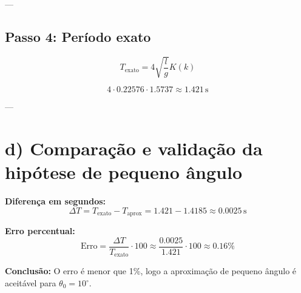 \documentclass[12pt]{article}
\begin{document}
---

\subsection*{Passo 4: Período exato}

\[
T_\text{exato} = 4 \sqrt{\frac{l}{g}} K(k)
\]

\[
4 \cdot 0.22576 \cdot 1.5737 \approx 1.421\,\text{s}
\]

---

\section*{d) Comparação e validação da hipótese de pequeno ângulo}

\textbf{Diferença em segundos:}
\[
\Delta T = T_\text{exato} - T_\text{aprox} = 1.421 - 1.4185 \approx 0.0025\,\text{s}
\]

\textbf{Erro percentual:}
\[
\text{Erro} = \frac{\Delta T}{T_\text{exato}} \cdot 100 \approx \frac{0.0025}{1.421} \cdot 100 \approx 0.16\%
\]

\textbf{Conclusão:}  
O erro é menor que 1\%, logo a aproximação de pequeno ângulo é aceitável para \(\theta_0 = 10^\circ\).
\end{document}
